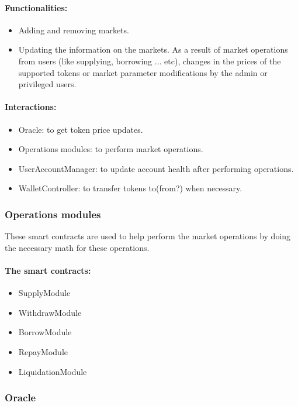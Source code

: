 \paragraph*{Functionalities:}
\begin{itemize}
  \item Adding and removing markets.
  \item Updating the information on the markets. As a result of market operations from users (like supplying, borrowing ... etc), changes in the prices of the supported tokens or market parameter modifications by the admin or privileged users.
\end{itemize}

\paragraph*{Interactions:}
\begin{itemize}
  \item Oracle: to get token price updates.
  \item Operations modules: to perform market operations.
  \item UserAccountManager: to update account health after performing operations.
  \item WalletController: to transfer tokens to(from?) when necessary.
\end{itemize}

\subsubsection{Operations modules}

These smart contracts are used to help perform the market operations by doing the necessary math for these operations.

\paragraph*{The smart contracts:}
\begin{itemize}
  \item SupplyModule
  \item WithdrawModule
  \item BorrowModule
  \item RepayModule
  \item LiquidationModule
\end{itemize}

\subsubsection{Oracle}

